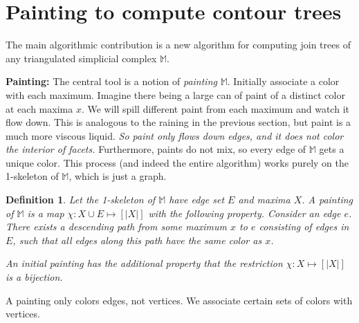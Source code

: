 \documentclass[11pt]{article}
\newtheorem{definition}[theorem]{Definition}
\theoremstyle{definition}
\newcommand{\MM}{\mathbb{M}}
\newcommand{\eps}{\varepsilon}
\begin{document}
\section{Painting to compute contour trees}

The main algorithmic contribution is a new algorithm for computing join trees of any triangulated simplicial
complex $\MM$.

%

{\bf Painting:} The central tool is a notion 
of \emph{painting} $\MM$. Initially associate a color with each maximum. Imagine there being a large
can of paint of a distinct color at each maxima $x$. We will spill different paint from each maximum and watch it flow down.
This is analogous to the raining in the previous section, but paint is a much more viscous liquid.
\emph{So paint only flows down edges, and it does not color the interior of facets.} Furthermore, paints
do not mix, so every edge of $\MM$ gets a unique color. This process (and indeed the entire algorithm)
works purely on the 1-skeleton of $\MM$, which is just a graph.
%
\begin{definition} \label{def:paint} Let the 1-skeleton of $\MM$ have edge set $E$ and maxima $X$.
A  \emph{painting} of $\MM$ is a map $\chi:X \cup E \mapsto [|X|]$ with the following property. 
 Consider an edge $e$. There exists a descending path from some maximum $x$ to $e$
	consisting of edges in $E$, such that all edges along this path have the same color as $x$. 

An \emph{initial} painting has the additional property that the restriction $\chi:X \mapsto [|X|]$ is a bijection.
\end{definition}
%

A painting only colors edges, not vertices. We associate certain
sets of colors with vertices.
\end{document}
